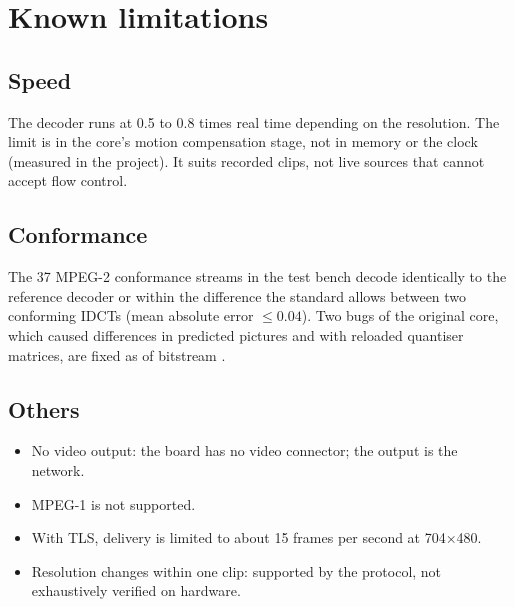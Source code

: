 \chapter{Known limitations}\label{cap:limitations}

\section{Speed}

The decoder runs at 0.5 to 0.8 times real time depending on the resolution.
The limit is in the core's motion compensation stage, not in memory or the
clock (measured in the project). It suits recorded clips, not live sources
that cannot accept flow control.

\section{Conformance}

The 37 MPEG-2 conformance streams in the test bench decode identically to the
reference decoder or within the difference the standard allows between two
conforming IDCTs (mean absolute error $\leq 0.04$). Two bugs of the original
core, which caused differences in predicted pictures and with reloaded
quantiser matrices, are fixed as of bitstream .

\section{Others}

\begin{itemize}
  \item No video output: the board has no video connector; the output is the
    network.
  \item MPEG-1 is not supported.
  \item With TLS, delivery is limited to about 15 frames per second at
    704×480.
  \item Resolution changes within one clip: supported by the protocol, not
    exhaustively verified on hardware.
\end{itemize}
